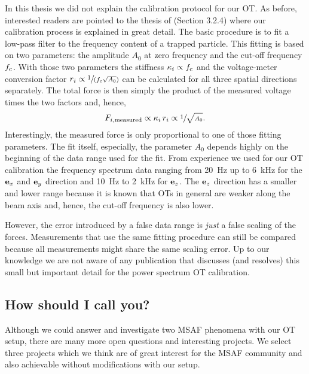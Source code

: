 In this thesis we did not explain the calibration protocol for our OT. As 
before, interested readers are pointed to the thesis of  
(Section 3.2.4) where our calibration process is explained in great detail. The 
basic procedure is to fit a low-pass filter to the frequency content of a 
trapped particle. This fitting is based on two parameters: the amplitude 
$A_{0}$ at zero frequency and the cut-off frequency $f_{\mathrm{c}}$. With those 
two parameters the stiffness $\kappa_{i}\propto f_{\mathrm{c}}$ and the 
voltage-meter conversion factor $r_{i}\propto \sfrac{1}{(f_{\mathrm{c}}\sqrt{A_{0}} 
)}$ can be calculated for all three spatial directions separately. The total 
force is then simply the product of the measured voltage times the two factors 
and, hence, \begin{equation}
  F_{i,\mathrm{measured}}\propto \kappa_{i}\,r_{i}\propto 
  \sfrac{1}{\sqrt{A_{0}}}.
\end{equation}
Interestingly, the measured force is only proportional to one of those fitting 
parameters. The fit itself, especially, the parameter $A_{0}$ depends highly on 
the beginning of the data range used for the fit. From experience we used for 
our OT calibration the frequency spectrum data ranging from \SI{20}{\hertz} up 
to \SI{6}{\kilo\hertz} for the $\vb{e}_{x}$ and $\vb{e}_{y}$ direction and \SI{10}{\hertz} to 
\SI{2}{\kilo\hertz} for $\vb{e}_{z}$. The $\vb{e}_{z}$ direction has a smaller and lower 
range because it is known that OTs in general are weaker along the beam axis 
and, hence, the cut-off frequency is also lower.

However, the error introduced by a false data range is \emph{just} a false 
scaling of the forces. Measurements that use the same fitting procedure can 
still be compared because all measurements might share the same scaling error. 
Up to our knowledge we are not aware of any publication that discusses (and 
resolves) this small but important detail for the power spectrum OT 
calibration.

\subsection{How should I call you?}

Although we could answer and investigate two MSAF phenomena with our OT setup, 
there are many more open questions and interesting projects. We select three 
projects which we think are of great interest for the MSAF community and also 
achievable without modifications with our setup.

